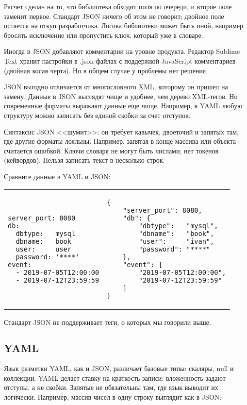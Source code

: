 Расчет сделан на то, что библиотека обходит поля по очереди, и второе поле
заменит первое. Стандарт JSON ничего об этом не говорит; двойное поле остается
на откуп разработчика. Логика библиотеки может быть иной, например бросить
исключение или пропустить ключ, который уже в словаре.

Иногда в JSON добавляют комментарии на уровне продукта. Редактор Sublime Text
хранит настройки в .json-файлах с поддержкой JavaScript-комментариев (двойная
косая черта). Но в общем случае у проблемы нет решения.

JSON выгодно отличается от многословного XML, которому он пришел на
замену. Данные в JSON выглядят чище и удобнее, чем дерево XML-тегов. Но
современные форматы выражают данные еще чище. Например, в YAML любую структуру
можно записать без единой скобки за счет отступов.

Синтаксис JSON <<шумит>>: он требует кавычек, двоеточий и запятых там, где
другие форматы лояльны. Например, запятая в конце массива или объекта считается
ошибкой. Ключи словаря не могут быть числами; нет токенов (кейвордов). Нельзя
записать текст в несколько строк.

Сравните данные в YAML и JSON:

\noindent
\begin{tabular}{ @{}p{5cm} @{}p{5cm} }

\begin{verbatim}
server_port: 8080
db:
  dbtype:   mysql
  dbname:   book
  user:     user
  password: '****'
event:
  - 2019-07-05T12:00:00
  - 2019-07-12T23:59:59
\end{verbatim}

&

\begin{verbatim}
{
    "server_port": 8080,
    "db": {
        "dbtype":   "mysql",
        "dbname":   "book",
        "user":     "ivan",
        "password": "****"
    },
    "event": [
        "2019-07-05T12:00:00",
        "2019-07-12T23:59:59"
    ]
}
\end{verbatim}

\end{tabular}

Стандарт JSON не поддерживает теги, о которых мы говорили выше.

\subsection{YAML}

Язык разметки YAML, как и JSON, различает базовые типы: скаляры, null и
коллекции. YAML делает ставку на краткость записи: вложенность задают отступы, а
не скобки. Запятые не обязательны там, где язык выводит их логически. Например,
массив чисел в одну строку выглядит как в JSON:


